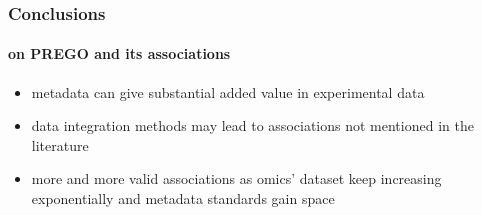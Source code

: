 \documentclass{beamer}
\begin{document}
   \begin{frame}
      \frametitle{Conclusions}
      \framesubtitle{on PREGO and its associations}

      \small
      \begin{itemize}
         \item metadata can give substantial added value in experimental data
         \item data integration methods may lead to associations not mentioned in the literature
         \item more and more valid associations as omics' dataset keep increasing exponentially and metadata standards gain space
      \end{itemize}
   \end{frame}
\end{document}
